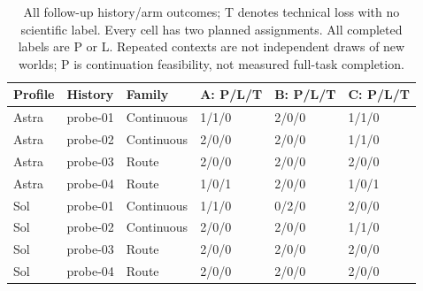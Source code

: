 \begin{table}[htbp]
\centering\small
\begin{tabular}{llllll}\toprule
Profile & History & Family & A: P/L/T & B: P/L/T & C: P/L/T\\\midrule
Astra & probe-01 & Continuous & 1/1/0 & 2/0/0 & 1/1/0\\
Astra & probe-02 & Continuous & 2/0/0 & 2/0/0 & 1/1/0\\
Astra & probe-03 & Route & 2/0/0 & 2/0/0 & 2/0/0\\
Astra & probe-04 & Route & 1/0/1 & 2/0/0 & 1/0/1\\
Sol & probe-01 & Continuous & 1/1/0 & 0/2/0 & 2/0/0\\
Sol & probe-02 & Continuous & 2/0/0 & 2/0/0 & 1/1/0\\
Sol & probe-03 & Route & 2/0/0 & 2/0/0 & 2/0/0\\
Sol & probe-04 & Route & 2/0/0 & 2/0/0 & 2/0/0\\
\bottomrule
\end{tabular}
\caption{All follow-up history/arm outcomes; T denotes technical loss with no scientific label. Every cell has two planned assignments. All completed labels are P or L. Repeated contexts are not independent draws of new worlds; P is continuation feasibility, not measured full-task completion.}
\label{tab:followup-histories}
\end{table}
